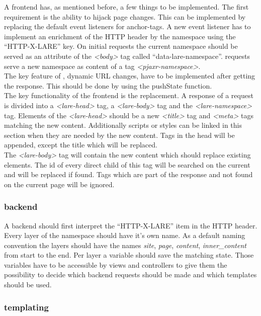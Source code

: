 A \lare{} frontend has, as mentioned before, a few things to be implemented.
The first requirement is the ability to hijack page changes.
This can be implemented by replacing the default event listeners for anchor-tags.
A new event listener has to implement an enrichment of the HTTP header by the namespace using the \enquote{HTTP-X-LARE} key.
On initial requests the current namespace should be served as an attribute of the \emph{<body>} tag called \enquote{data-lare-namespace}.
\lare{} requests serve a new namespace as content of a tag \emph{<pjaxr-namespace>}.
\\
The key feature of \lare{}, dynamic URL changes, have to be implemented after getting the response.
This should be done by using the pushState function.
\\
The key functionality of the \lare{} frontend is the replacement.
A response of a \lare{} request is divided into a \emph{<lare-head>} tag, a \emph{<lare-body>} tag and the \emph{<lare-namespace>} tag.
Elements of the \emph{<lare-head>} should be a new \emph{<title>} tag and \emph{<meta>} tags matching the new content. 
Additionally scripts or styles can be linked in this section when they are needed by the new content.
Tags in the head will be appended, except the title which will be replaced.
\\
The \emph{<lare-body>} tag will contain the new content which should replace existing elements.
The id of every direct child of this tag will be searched on the current \webPage{} and will be replaced if found.
Tags which are part of the response and not found on the current page will be ignored.

\subsubsection{\lare{} backend\label{sec:lare_backend}}

A \lare{} backend should first interpret the \enquote{HTTP-X-LARE} item in the HTTP header.
Every layer of the namespace should have it's own name.
As a default naming convention the layers should have the names \emph{site}, \emph{page}, \emph{content}, \emph{inner\_content} from start to the end.
Per layer a variable should save the matching state.
Those variables have to be accessible by views and controllers to give them the possibility to decide which backend requests should be made and which templates should be used.

\subsubsection{\lare{} templating\label{sec:lare_templating}}

